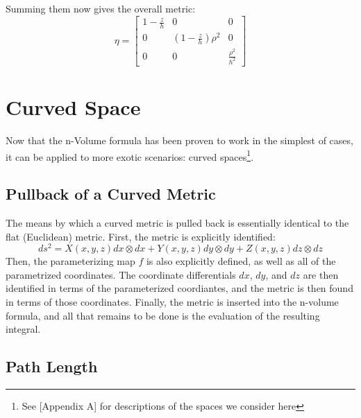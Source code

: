 \documentclass{article}
\begin{document}
Summing them now gives the overall metric:
\[
\eta = \begin{bmatrix}
 1-\frac{z}{h} & 0 & 0 \\
 0 & (1-\frac{z}{h}) \rho^2 & 0 \\
 0 & 0 & \frac{\rho^2}{h^2}
\end{bmatrix}
\]

\newpage

\section{Curved Space}
Now that the n-Volume formula has been proven to work in the simplest of cases, it can be applied to more exotic scenarios: curved spaces\footnote{See [Appendix A] for descriptions of the spaces we consider here}.

\subsection{Pullback of a Curved Metric}
The means by which a curved metric is pulled back is essentially identical to the flat (Euclidean) metric. First, the metric is explicitly identified:
\[
ds^2 = X(x,y,z) dx \otimes dx + Y(x,y,z) dy \otimes dy + Z(x,y,z) dz \otimes dz
\]
Then, the parameterizing map $f$ is also explicitly defined, as well as all of the parametrized coordinates. The coordinate differentials $dx$, $dy$, and $dz$ are then identified in terms of the parameterized coordiantes, and the metric is then found in terms of those coordinates. Finally, the metric is inserted into the n-volume formula, and all that remains to be done is the evaluation of the resulting integral.

\newpage
\subsection{Path Length}
\end{document}
